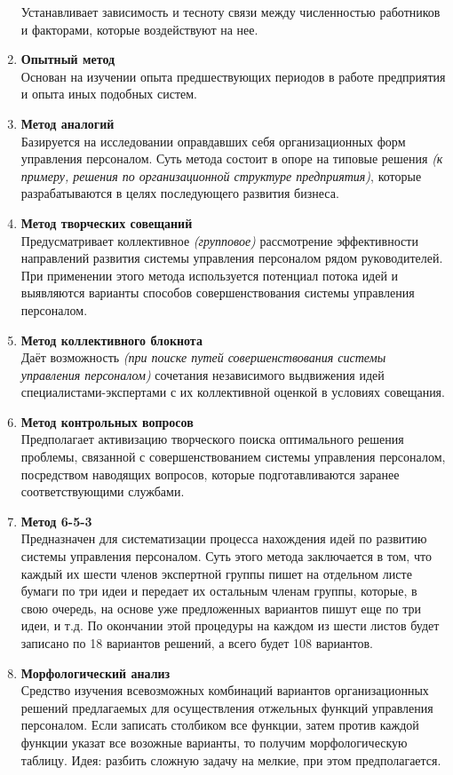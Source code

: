 \documentclass[a4paper,12pt,oneside,final]{extarticle}
\numberwithin{equation}{section}
\begin{document}
\begin{enumerate}
	Устанавливает зависимость и тесноту связи между численностью работников и факторами, которые воздействуют на нее.
	\item \textbf{Опытный метод} \\ 
	Основан на изучении опыта предшествующих периодов в работе предприятия и опыта иных подобных систем.
	\item \textbf{Метод аналогий} \\
	Базируется на исследовании оправдавших себя организационных форм управления персоналом. 
	Суть метода состоит в опоре на типовые решения \textit{(к примеру, решения по организационной структуре предприятия)}, которые разрабатываются в целях последующего развития бизнеса.
	\item \textbf{Метод творческих совещаний} \\ 
	Предусматривает коллективное \textit{(групповое)} рассмотрение эффективности направлений развития системы управления персоналом рядом руководителей. 
	При применении этого метода используется потенциал потока идей и выявляются варианты способов совершенствования системы управления персоналом.
	\item \textbf{Метод коллективного блокнота} \\ 
	Даёт возможность \textit{(при поиске путей совершенствования системы управления персоналом)} сочетания независимого выдвижения идей специалистами-экспертами с их коллективной оценкой в условиях совещания.
	\item \textbf{Метод контрольных вопросов} \\ 
	Предполагает активизацию творческого поиска оптимального решения проблемы, связанной с совершенствованием системы управления персоналом, посредством наводящих вопросов, которые подготавливаются заранее соответствующими службами.
	\item \textbf{Метод 6-5-3} \\
	Предназначен для систематизации процесса нахождения идей по развитию системы управления персоналом. 
	Суть этого метода заключается в том, что каждый их шести членов экспертной группы пишет на отдельном листе бумаги по три идеи и передает их остальным членам группы, которые, в свою очередь, на основе уже предложенных вариантов пишут еще по три идеи, и т.д. 
	По окончании этой процедуры на каждом из шести листов будет записано по 18 вариантов решений, а всего будет 108 вариантов.
	\item \textbf{Морфологический анализ} \\ 
	Средство изучения всевозможных комбинаций вариантов организационных решений предлагаемых для осуществления отжельных функций управления персоналом. 
	Если записать столбиком все функции, затем против каждой функции указат все возожные варианты, то получим морфологическую таблицу. 
	Идея: разбить сложную задачу на мелкие, при этом предполагается.
\end{enumerate}
\end{document}
